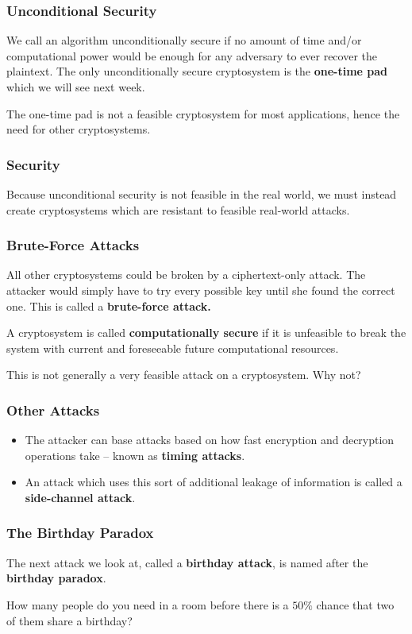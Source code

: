 \documentclass{beamer}
\newcommand{\<}{\langle}
\renewcommand{\>}{\rangle}
\begin{document}
\begin{frame}
\frametitle{Unconditional Security}

We call an algorithm unconditionally secure if no amount of time and/or computational power would be enough for any adversary to ever recover the plaintext. The only unconditionally secure cryptosystem is the \textbf{one-time pad} which we will see next week.\newline

The one-time pad is not a feasible cryptosystem for most applications, hence the need for other cryptosystems. 
\end{frame}

\begin{frame}
\frametitle{Security}

Because unconditional security is not feasible in the real world, we must instead create cryptosystems which are resistant to feasible real-world attacks. 
\end{frame}

\begin{frame}
\frametitle{Brute-Force Attacks}

All other cryptosystems could be broken by a ciphertext-only attack. The attacker would simply have to try every possible key until she found the correct one. This is called a \textbf{brute-force attack.}\newline

A cryptosystem is called \textbf{computationally secure} if it is unfeasible to break the system with current and foreseeable future computational resources.  \newline

This is not generally a very feasible attack on a cryptosystem. Why not?
\end{frame}

\begin{frame}
\frametitle{Other Attacks}

\begin{itemize}
\item The attacker can base attacks based on how fast encryption and decryption operations take -- known as \textbf{timing attacks}.
\item An attack which uses this sort of additional leakage of information is called a \textbf{side-channel attack}.
\end{itemize}
\end{frame}

\begin{frame}
\frametitle{The Birthday Paradox}

The next attack we look at, called a \textbf{birthday attack}, is named after the \textbf{birthday paradox}.\newline

How many people do you need in a room before there is a $50\%$ chance that two of them share a birthday?
\end{frame}
\end{document}
